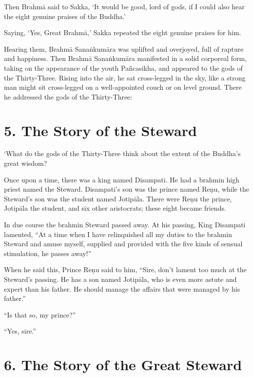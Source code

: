 \documentclass[12pt,openany]{book}%
\begin{document}
Then \textsanskrit{Brahmā} said to Sakka, ‘It would be good, lord of gods, if I could also hear the eight genuine praises of the Buddha.’ 

Saying, ‘Yes, Great \textsanskrit{Brahmā},’ Sakka repeated the eight genuine praises for him. 

Hearing them, \textsanskrit{Brahmā} \textsanskrit{Sanaṅkumāra} was uplifted and overjoyed, full of rapture and happiness. Then \textsanskrit{Brahmā} \textsanskrit{Sanaṅkumāra} manifested in a solid corporeal form, taking on the appearance of the youth \textsanskrit{Pañcasikha}, and appeared to the gods of the Thirty-Three. Rising into the air, he sat cross-legged in the sky, like a strong man might sit cross-legged on a well-appointed couch or on level ground. There he addressed the gods of the Thirty-Three: 

\section*{5. The Story of the Steward }

‘What do the gods of the Thirty-Three think about the extent of the Buddha’s great wisdom? 

Once upon a time, there was a king named Disampati. He had a brahmin high priest named the Steward. Disampati’s son was the prince named \textsanskrit{Reṇu}, while the Steward’s son was the student named \textsanskrit{Jotipāla}. There were \textsanskrit{Reṇu} the prince, \textsanskrit{Jotipāla} the student, and six other aristocrats; these eight became friends. 

In due course the brahmin Steward passed away. At his passing, King Disampati lamented, “At a time when I have relinquished all my duties to the brahmin Steward and amuse myself, supplied and provided with the five kinds of sensual stimulation, he passes away!” 

When he said this, Prince \textsanskrit{Reṇu} said to him, “Sire, don’t lament too much at the Steward’s passing. He has a son named \textsanskrit{Jotipāla}, who is even more astute and expert than his father. He should manage the affairs that were managed by his father.” 

“Is that so, my prince?” 

“Yes, sire.” 

\section*{6. The Story of the Great Steward }
\end{document}
